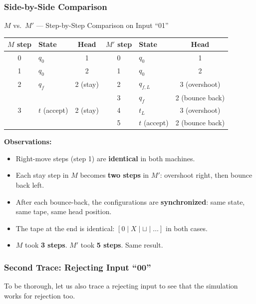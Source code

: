 \subsubsection{Side-by-Side Comparison}

\begin{examplebox}{$M$ vs.\ $M'$ --- Step-by-Step Comparison on Input ``01''}

\begin{center}
\begin{tabular}{clcclc}
\toprule
\textbf{$M$ step} & \textbf{State} & \textbf{Head} & \textbf{$M'$ step} & \textbf{State} & \textbf{Head} \\
\midrule
0 & $q_0$ & 1 & 0 & $q_0$ & 1 \\
1 & $q_0$ & 2 & 1 & $q_0$ & 2 \\
2 & $q_f$ & 2 (stay) & 2 & $q_{f,L}$ & 3 (overshoot) \\
  &       &          & 3 & $q_f$ & 2 (bounce back) \\
3 & $t$ (accept) & 2 (stay) & 4 & $t_L$ & 3 (overshoot) \\
  &              &            & 5 & $t$ (accept) & 2 (bounce back) \\
\bottomrule
\end{tabular}
\end{center}

\textbf{Observations:}
\begin{itemize}[nosep]
\item Right-move steps (step 1) are \textbf{identical} in both machines.
\item Each stay step in $M$ becomes \textbf{two steps} in $M'$: overshoot right, then bounce back left.
\item After each bounce-back, the configurations are \textbf{synchronized}: same state, same tape, same head position.
\item The tape at the end is identical: $[0 \mid X \mid \sqcup \mid \ldots]$ in both cases.
\item $M$ took \textbf{3 steps}. $M'$ took \textbf{5 steps}. Same result.
\end{itemize}
\end{examplebox}

\subsubsection{Second Trace: Rejecting Input ``00''}

To be thorough, let us also trace a rejecting input to see that the simulation works for rejection too.

